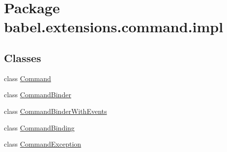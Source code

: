 \hypertarget{namespacebabel_1_1extensions_1_1command_1_1impl}{\section{Package babel.\-extensions.\-command.\-impl}
\label{namespacebabel_1_1extensions_1_1command_1_1impl}
}
\subsection*{Classes}
\begin{DoxyCompactItemize}
\item 
class \hyperlink{classbabel_1_1extensions_1_1command_1_1impl_1_1_command}{Command}
\item 
class \hyperlink{classbabel_1_1extensions_1_1command_1_1impl_1_1_command_binder}{Command\-Binder}
\item 
class \hyperlink{classbabel_1_1extensions_1_1command_1_1impl_1_1_command_binder_with_events}{Command\-Binder\-With\-Events}
\item 
class \hyperlink{classbabel_1_1extensions_1_1command_1_1impl_1_1_command_binding}{Command\-Binding}
\item 
class \hyperlink{classbabel_1_1extensions_1_1command_1_1impl_1_1_command_exception}{Command\-Exception}
\end{DoxyCompactItemize}
